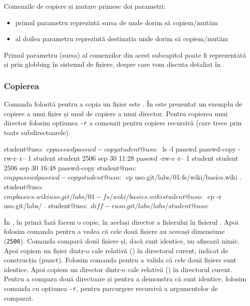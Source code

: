 Comenzile de copiere și mutare primesc doi parametri:

\begin{itemize}
  \item primul parametru reprezintă sursa de unde dorim să copiem/mutăm
  \item al doilea parametru reprezintă destinația unde dorim să copiem/mutăm
\end{itemize}

\begin{note}[Observație]
Primul parametru (sursa) al comenzilor din acest subcapitol poate fi reprezentată și prin globbing în sistemul de fișiere, despre care vom discuta detaliat în .
\end{note}

\subsubsection{Copierea}
\label{sec:fs:cp}

Comanda folosită pentru a copia un fișier este .
În  este prezentat un exemplu de copiere a unui fișier și unul de copiere a unui director.
Pentru copierea unui director folosim opțiunea \texttt{-r} a comenzii  pentru copiere recursivă (care trece prin toate subdirectoarele).

\begin{screen}[caption={Copierea fișierelor și directoarelor},label={lst:fs:cp}]
student@uso:~$ cp passwd passwd-copy
student@uso:~$ ls -l passwd passwd-copy
-rw-r--r-- 1 student student 2506 sep 30 11:28 passwd
-rw-r--r-- 1 student student 2506 sep 30 16:48 passwd-copy
student@uso:~$ cmp passwd passwd-copy
student@uso:~$ cp uso.git/labs/01-fs/wiki/basics.wiki .
student@uso:~$ cmp basics.wiki uso.git/labs/01-fs/wiki/basics.wiki
student@uso:~$ cp -r uso.git/labs/ .
student@uso:~$ diff -r uso.git/labs/ labs/
student@uso:~$
\end{screen}

În , în primă fază facem o copie, în același director a fișierului  în fișierul .
Apoi folosim comanda  pentru a vedea că cele două fișiere au aceeași dimensiune (\texttt{2506}).
Comanda  compară două fișiere și, dacă sunt identice, nu afișează nimic.
Apoi copiem un fișier dintr-o cale relativă () în directorul curent, indicat de construcția  (punct).
Folosim comanda  pentru a valida că cele două fișiere sunt identice.
Apoi copiem un director dintr-o cale relativă () în directorul curent.
Pentru a compara două directoare și pentru a demonstra că sunt identice, folosim comanda  cu opțiunea \texttt{-r}, pentru parcurgere recursivă a argumentelor de comparat.

